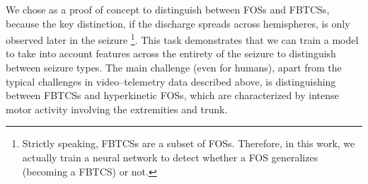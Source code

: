 We chose as a proof of concept to distinguish between \acp{FOS} and \acp{FBTCS}, because the key distinction, if the discharge spreads across hemispheres, is only observed later in the seizure%
\footnote{Strictly speaking, \acp{FBTCS} are a subset of \acp{FOS}. Therefore, in this work, we actually train a neural network to detect whether a \ac{FOS} generalizes (becoming a \ac{FBTCS}) or not.}.
This task demonstrates that we can train a model to take into account features across the entirety of the seizure to distinguish between seizure types.
The main challenge (even for humans), apart from the typical challenges in video--telemetry data described above, is distinguishing between \acp{FBTCS} and hyperkinetic \acp{FOS}, which are characterized by intense motor activity involving the extremities and trunk.
